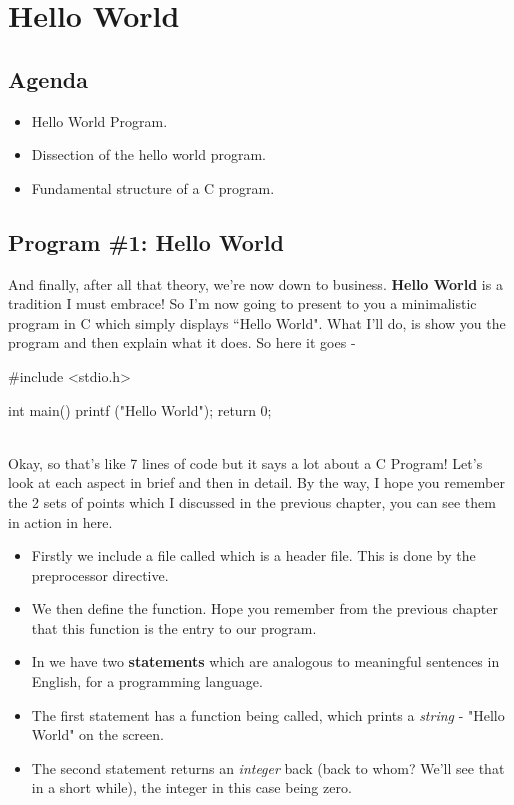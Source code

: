 \chapter{Hello World}


\section{Agenda}
\begin{itemize}
 \item Hello World Program.
 \item Dissection of the hello world program.
 \item Fundamental structure of a C program.
\end{itemize}

\section{Program \#1: Hello World}
And finally, after all that theory, we're now down to business. \textbf{Hello World} is a tradition I must embrace! So I'm now going to present to you a minimalistic program in C which simply displays ``Hello World". What I'll do, is show you the program and then explain what it does. So here it goes - \\

\begin{ccode}
#include <stdio.h>

int main()
{
  printf ("Hello World\n");
  return 0;
}
\end{ccode}
\\

Okay, so that's like 7 lines of code but it says a lot about a C Program! Let's look at each aspect in brief and then in detail. By the way, I hope you remember the 2 sets of points which I discussed in the previous chapter, you can see them in action in here.

\begin{itemize}
\item Firstly we include a file called  which is a header file. This is done by the  preprocessor directive.
\item We then define the  function. Hope you remember from the previous chapter that this function is the entry to our program. 
\item In  we have two \textbf{statements} which are analogous to meaningful sentences in English, for a programming language. 
\item The first statement has a function being called,  which prints a \textit{string} - "Hello World\n" on the screen. 
\item The second statement returns an \textit{integer} back (back to whom? We'll see that in a short while), the integer in this case being zero. 
\end{itemize}

